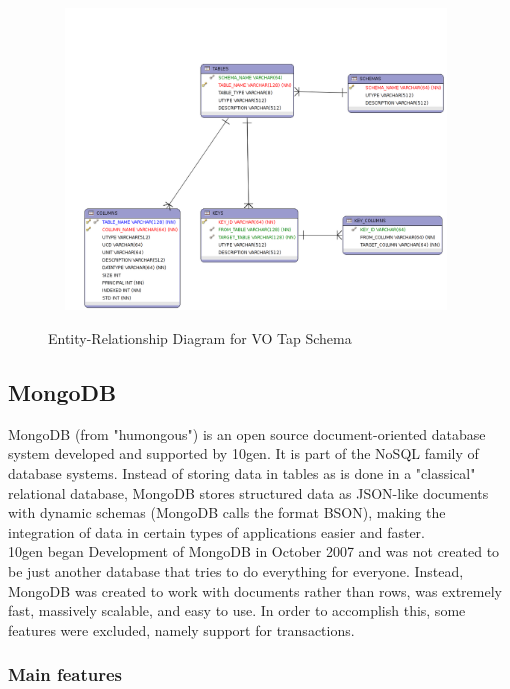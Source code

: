 \begin{figure}
\centering
\includegraphics[width=11cm,height=8cm]{images/erd_postgres.png}\\
\caption{Entity-Relationship Diagram for VO Tap Schema}
\end{figure}


\subsection{MongoDB}

MongoDB (from "humongous") is an open source document-oriented database system developed and supported by 10gen. It is part of the NoSQL family of database systems. Instead of storing data in tables as is done in a "classical" relational database, MongoDB stores structured data as JSON-like documents with dynamic schemas (MongoDB calls the format BSON), making the integration of data in certain types of applications easier and faster. \\

10gen began Development of MongoDB in October 2007 and was not created to be just another database that tries to do everything for everyone. Instead, MongoDB was created to work with documents rather than rows, was extremely fast, massively scalable, and easy to use. In order to accomplish this, some features were excluded, namely support for transactions.

\subsubsection{Main features}

